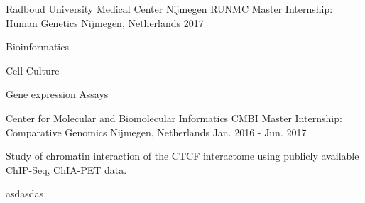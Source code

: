 

\begin{cventries}

  \cventry
    {Radboud University Medical Center Nijmegen RUNMC} %
    {Master Internship: Human Genetics} %
    {Nijmegen, Netherlands} %
    {2017} %
    {
      \begin{cvitems} %
        \item {Bioinformatics}
        \item {Cell Culture}
        \item {Gene expression Assays}
      \end{cvitems}
    }

  \cventry
    {Center for Molecular and Biomolecular Informatics CMBI} %
    {Master Internship: Comparative Genomics} %
    {Nijmegen, Netherlands} %
    {Jan. 2016 - Jun. 2017} %
    {
      \begin{cvitems} %
        \item {Study of chromatin interaction of the CTCF interactome using publicly available ChIP-Seq, ChIA-PET data.}
        \item {asdasdas}
      \end{cvitems}
    }
\end{cventries}

